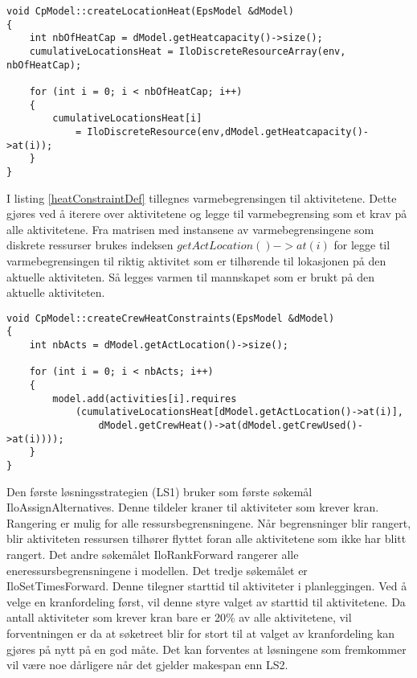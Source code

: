 {\tiny %
\begin{lstlisting}[label=heatCodeDef,caption=Oppretting av varmebegrensing]
void CpModel::createLocationHeat(EpsModel &dModel)
{
	int nbOfHeatCap = dModel.getHeatcapacity()->size();
	cumulativeLocationsHeat = IloDiscreteResourceArray(env, nbOfHeatCap);

	for (int i = 0; i < nbOfHeatCap; i++)
	{
		cumulativeLocationsHeat[i] 
			= IloDiscreteResource(env,dModel.getHeatcapacity()->at(i));
	}
}
\end{lstlisting}
I listing \ref{heatConstraintDef} tillegnes varmebegrensingen til aktivitetene. Dette gjøres ved å iterere over aktivitetene og legge til varmebegrensing som et krav på alle aktivitetene. Fra matrisen med instansene av varmebegrensingene som diskrete ressurser brukes indeksen $getActLocation()->at(i)$ for legge til varmebegrensingen til riktig aktivitet som er tilhørende til lokasjonen på den aktuelle aktiviteten. Så legges varmen til mannskapet som er brukt på den aktuelle aktiviteten.
\begin{lstlisting}[label=heatConstraintDef,caption=Tilegning av varmebegrensing til aktiviteter]
void CpModel::createCrewHeatConstraints(EpsModel &dModel)
{
	int nbActs = dModel.getActLocation()->size();

	for (int i = 0; i < nbActs; i++)
	{
		model.add(activities[i].requires
			(cumulativeLocationsHeat[dModel.getActLocation()->at(i)], 
				dModel.getCrewHeat()->at(dModel.getCrewUsed()->at(i))));
	}
}
\end{lstlisting}
} %

Den første løsningsstrategien (LS1) bruker som første søkemål IloAssignAlternatives. Denne tildeler kraner til aktiviteter som krever kran. Rangering er mulig for alle ressursbegrensningene. Når begrensninger blir rangert, blir aktiviteten ressursen tilhører flyttet foran alle aktivitetene som ikke har blitt rangert. Det andre søkemålet IloRankForward rangerer alle eneressursbegrensningene i modellen. Det tredje søkemålet er IloSetTimesForward. Denne tilegner starttid til aktiviteter i planleggingen. Ved å velge en kranfordeling først, vil denne styre valget av starttid til aktivitetene. Da antall aktiviteter som krever kran bare er 20\% av alle aktivitetene, vil forventningen er da at søketreet blir for stort til at valget av kranfordeling kan gjøres på nytt på en god måte. Det kan forventes at løsningene som fremkommer vil være noe dårligere når det gjelder makespan enn LS2.

